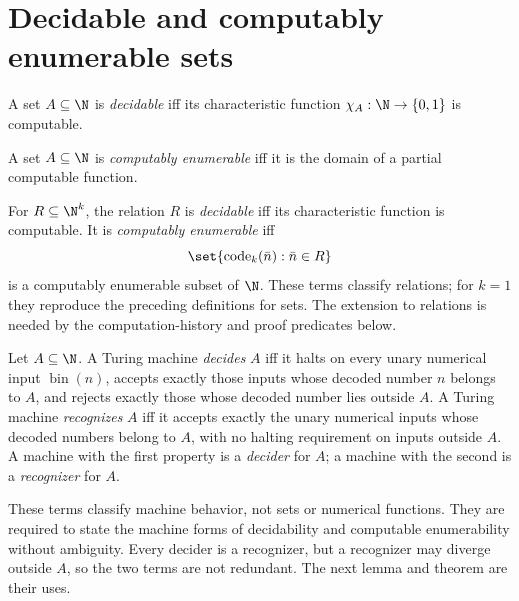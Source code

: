 \section{Decidable and computably enumerable sets}
\label{sec:turing-machines-03}

\begin{definition}
A set \(A\subseteq\N\) is \emph{decidable} iff its characteristic function
\(\chi_A:\N\to\{0,1\}\) is computable.
\end{definition}

\begin{definition}
A set \(A\subseteq\N\) is \emph{computably enumerable} iff it is the domain
of a partial computable function.
\end{definition}

\begin{definition}
For \(R\subseteq\N^k\), the relation \(R\) is \emph{decidable} iff its
characteristic function is computable.  It is \emph{computably enumerable}
iff
\[
  \set{\operatorname{code}_k(\bar n):\bar n\in R}
\]
is a computably enumerable subset of \(\N\).  These terms classify relations;
for \(k=1\) they reproduce the preceding definitions for sets.  The extension
to relations is needed by the computation-history and proof predicates below.
\end{definition}

\begin{definition}
Let \(A\subseteq\N\).  A Turing machine \emph{decides} \(A\) iff it halts on
every unary numerical input \(\operatorname{bin}(n)\), accepts exactly those inputs
whose decoded number \(n\) belongs to \(A\), and rejects exactly those whose
decoded number lies outside \(A\).  A Turing machine \emph{recognizes} \(A\)
iff it accepts exactly the unary numerical inputs whose decoded numbers belong
to \(A\), with no halting requirement on inputs outside \(A\).  A machine with
the first property is a \emph{decider} for \(A\); a machine with the second is
a \emph{recognizer} for \(A\).

These terms classify machine behavior, not sets or numerical functions.  They
are required to state the machine forms of decidability and computable
enumerability without ambiguity.  Every decider is a recognizer, but a
recognizer may diverge outside \(A\), so the two terms are not redundant.  The
next lemma and theorem are their uses.
\end{definition}

